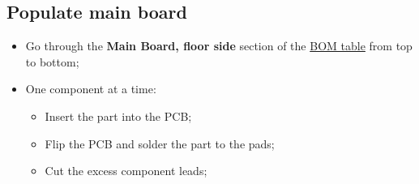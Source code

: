 \documentclass[a4paper,12pt]{article}
\begin{document}
\restoregeometry{}





\subsection{Populate main board}

\begin{itemize}
  \item Go through the \textbf{Main Board, floor side} section of the
    \hyperref[tbl:BOM]{BOM table} from top to bottom;
  \item One component at a time:
    \begin{itemize}
      \item Insert the part into the PCB;
      \item Flip the PCB and solder the part to the pads;
      \item Cut the excess component leads;
    \end{itemize}
\end{itemize}
\end{document}
